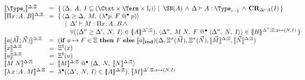 \documentclass{article}
\begin{document}
\begin{figure*}
\centering
\iftechreport\else\begin{small}\fi
\begin{math}
\begin{array}{@{}l@{\hspace{6pt}}c@{\hspace{6pt}}l@{}}
  \interp{\Type_i} & = &
  \setcompr{\triple{\Delta}{A}{I \subseteq(\Ctxt\times\Term\times\Ii)}}{
    \SN(A) \mywedge \typej[\Delta]{A}{\Type_{i-1}} \mywedge \CR{\Delta}{A}{I}}
\\



\interp{\pitype{x}{A}{B}} & = &
\setcomprlong{\triple{\Delta\geq\Delta}{M}{(\lamstarnot{p}{\appstar{F}{p}})}}{
  \typej[\Delta']{M}{\pitype{x}{A}{B}} \mywedge\\
  \forall(\triple{\Delta''\geq\Delta'}{N}{I}\in\interpd[\iargs{\Delta'}{\Xi}]{A}) .\;
  \triple{\Delta''}{M\;N}{\appstar{F}{\triple{\Delta''}{N}{I}}} \in\interpd[\iargs{\Delta''}{\Xi,\dxform{N}{I}}]{B}
}
\\

\interp{\ctorapp{a}{\vec{M}}{\vec{N}}} & = &
(\ifthen{a\mapsto F\in\Xi}{F}{\interpind{a}})
(\Delta,\Dsubst(\vec{M}),\Dsubst(\vec{N}), \interp{\vec{M}},\interp{\vec{N}})

\\


\interp{x} & = & \Dlookup{x}
\\

\interp{u} & = & \Dlookup{u}
\\

\interp{M\;N} & = & \appstar{\interp{M}}{\triple{\Delta}{N}{\interp{N}}}\\

\interp{\lamabs{x}{A}{M}} & = &
\lamstar{\triple{\Delta'}{N}{I}}{\interpd{A}}{\interp[\iargs{\Delta'}{\Xi,\dxform{N}{I}}]{M}}
\\


\end{array}
\end{math}
\end{small}
\end{figure*}
\end{document}
